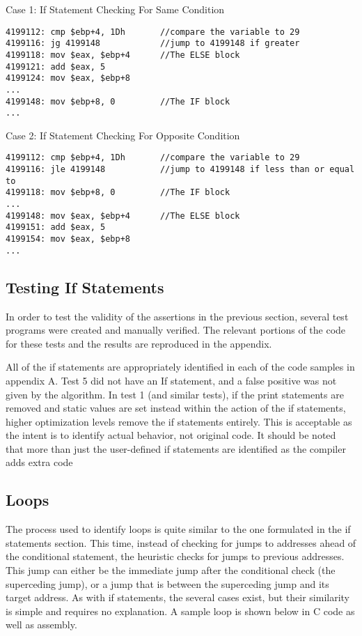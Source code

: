 \documentclass{article}
\begin{document}
\begin{algorithm}
\lstset{language=[mips]Assembler}
\caption{Case 1: If Statement Checking For Same Condition}
\begin{lstlisting}
4199112: cmp $ebp+4, 1Dh       //compare the variable to 29
4199116: jg 4199148            //jump to 4199148 if greater
4199118: mov $eax, $ebp+4      //The ELSE block
4199121: add $eax, 5 
4199124: mov $eax, $ebp+8
...
4199148: mov $ebp+8, 0         //The IF block
...
\end{lstlisting}
\end{algorithm}
\begin{algorithm}
\lstset{language=[mips]Assembler}
\caption{Case 2: If Statement Checking For Opposite Condition}
\begin{lstlisting}
4199112: cmp $ebp+4, 1Dh       //compare the variable to 29
4199116: jle 4199148           //jump to 4199148 if less than or equal to
4199118: mov $ebp+8, 0         //The IF block
...
4199148: mov $eax, $ebp+4      //The ELSE block
4199151: add $eax, 5 
4199154: mov $eax, $ebp+8
...
\end{lstlisting}
\end{algorithm}
\subsection*{Testing If Statements}

In order to test the validity of the assertions in the previous section, several test programs were created and manually verified. The
relevant portions of the code for these tests and the results are reproduced in the appendix. 

\noindent All of the if statements are appropriately identified in each of the code samples in appendix A.  Test 5 did not have an If statement,
and a false positive was not given by the algorithm.  In test 1 (and similar tests), if the print statements are removed and static values are set 
instead within the action of the if statements, higher optimization levels remove the if statements entirely.  This is acceptable as the intent is to identify
actual behavior, not original code. It should be noted that more than just the user-defined if statements are identified as the compiler adds 
extra code \\

\subsection*{Loops}
The process used to identify loops is quite similar to the one formulated in the if statements section.  This time, instead of checking for jumps to addresses ahead of the conditional statement, the heuristic checks for jumps to previous addresses.  This jump can either be the immediate jump after the conditional check (the superceding jump), or a jump that is between the superceding jump and its target address. As with if statements, the several cases exist, but their similarity is simple and requires no explanation.  A sample loop is shown below in C code as well as assembly.  
\end{document}
